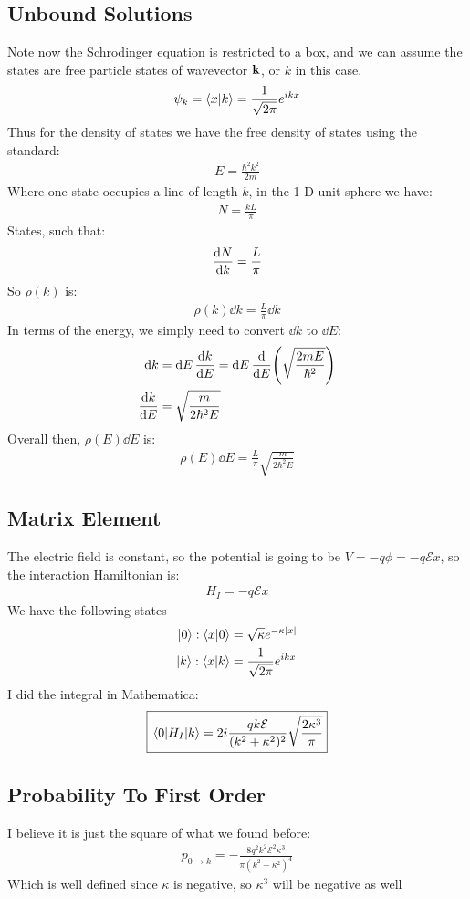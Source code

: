 \documentclass[12pt]{article}
\begin{document}
\subsection{Unbound Solutions}
Note now the Schrodinger equation is restricted to a box, and we can assume the states are free particle states of wavevector $\vb{k}$, or $k$ in this case.
\begin{align*}
  \psi_{k}=\ip{x}{k}=\frac1{\sqrt{2\pi}}e^{ikx}
\end{align*}
Thus for the density of states we have the free density of states using the standard:
\begin{align*}
  E=\frac{\hbar^2k^2}{2m}
\end{align*}
Where one state occupies a line of length $k$, in the 1-D unit sphere we have:
\begin{align*}
  N=\frac{kL}{\pi}
\end{align*}
States, such that:
\begin{align*}
  \dv{N}{k}=\frac{L}{\pi}
\end{align*}
So $\rho(k)$ is:
\begin{align}
  \boxed{\rho(k)\dd{k}=\frac{L}{\pi}\dd{k}}
\end{align}
In terms of the energy, we simply need to convert $\dd{k}$ to $\dd{E}$:
\begin{align*}
  \dd{k}&=\dd{E}\dv{k}{E}=\dd{E}\dv{E}\qty(\sqrt{\frac{2mE}{\hbar^2}})\\
  \dv{k}{E}&=\sqrt{\frac{m}{2\hbar^2E}}
\end{align*}
Overall then, $\rho(E)\dd{E}$ is:
\begin{align}
  \boxed{\rho(E)\dd{E}=\frac{L}\pi\sqrt{\frac{m}{2\hbar^2E}}}
\end{align}

\subsection{Matrix Element}
The electric field is constant, so the potential is going to be $V=-q\phi=-q\mathcal{E}x$, so the interaction Hamiltonian is:
\begin{align*}
  H_I=-q\mathcal{E}x
\end{align*}
We have the following states
\begin{align*}
  \ket{0}:\ip{x}{0}&=\sqrt{\kappa}e^{-\kappa \abs{x}}\\
  \ket{k}:\ip{x}{k}&=\frac1{\sqrt{2\pi}}e^{ikx}
\end{align*}
I did the integral in Mathematica:
\begin{align}
  \boxed{\mel{0}{H_I}{k}=2i \frac{qk\mathcal{E}}{(k^2+\kappa^2)^2}
  \sqrt{\frac{2\kappa^3}{\pi}}}
\end{align}

\subsection{Probability To First Order}
I believe it is just the square of what we found before:
\begin{align*}
  \boxed{p_{0\to k}=-\frac{8q^2k^2\mathcal{E}^2\kappa^3}{\pi(k^2+\kappa^2)^4}}
\end{align*}
Which is well defined since $\kappa$ is negative, so $\kappa^3$ will be negative as well
\end{document}
